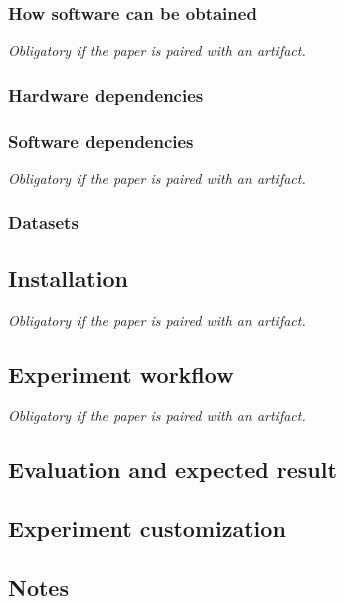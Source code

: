\subsubsection{How software can be obtained }
{\em Obligatory if the paper is paired with an artifact.}

\subsubsection{Hardware dependencies}

\subsubsection{Software dependencies}
{\em Obligatory if the paper is paired with an artifact.}


\subsubsection{Datasets}

\subsection{Installation}

{\em Obligatory if the paper is paired with an artifact.}

\subsection{Experiment workflow}

{\em Obligatory if the paper is paired with an artifact.}

\subsection{Evaluation and expected result}


\subsection{Experiment customization}

\subsection{Notes}

